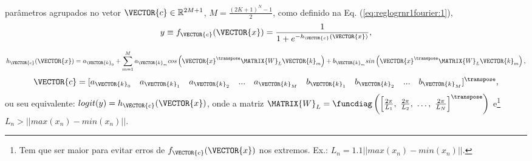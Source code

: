 \begin{theorem}
\begin{minipage}{0.55\textwidth}
parâmetros agrupados no vetor $\VECTOR{c}\in \mathbb{R}^{2 M+1}$, 
$M=\frac{(2 K+1)^N-1}{2}$,
como definido na Eq. (\ref{eq:reglogrnr1fourier:1}),
\begin{equation}\label{eq:reglogrnr1fourier:1}
y\equiv f_{\VECTOR{c}}(\VECTOR{x})= \frac{1}{1+e^{-h_{\VECTOR{c}}(\VECTOR{x}) }},
\end{equation}
\end{minipage}
\begin{equation}
 h_{\VECTOR{c}}(\VECTOR{x}) = a_{\VECTOR{k}_{0}}+
\sum_{m=1}^{M}
a_{\VECTOR{k}_{m}} cos\left(\VECTOR{x}^{\transpose}\MATRIX{W}_{L}\VECTOR{k}_{m}\right)+
b_{\VECTOR{k}_{m}} sin\left(\VECTOR{x}^{\transpose}\MATRIX{W}_{L}\VECTOR{k}_{m}\right),
\end{equation}
\begin{equation}
\VECTOR{c}=[
a_{\VECTOR{k}_{0}}\quad 
a_{\VECTOR{k}_{1}}\quad  
a_{\VECTOR{k}_{2}}\quad  
...\quad 
a_{\VECTOR{k}_{M}}\quad  
b_{\VECTOR{k}_{1}}\quad 
b_{\VECTOR{k}_{2}}\quad 
...\quad 
b_{\VECTOR{k}_{M}}
]^{\transpose},
\end{equation}
ou seu equivalente: $logit(y)=h_{\VECTOR{c}}(\VECTOR{x})$, onde a matriz
$\MATRIX{W}_{L}=\funcdiag\left(\left[\frac{2 \pi}{L_1},~\frac{2 \pi}{L_2},~\dots,~\frac{2 \pi}{L_N}\right]^{\transpose}\right)$
e\footnote{Tem 
que ser maior para evitar erros de $f_{\VECTOR{c}}(\VECTOR{x})$ nos extremos. 
Ex.: $L_n =1.1 || max(x_n)-min(x_n)||$.}
 $L_n > || max(x_n)-min(x_n)||$.


\end{theorem}
